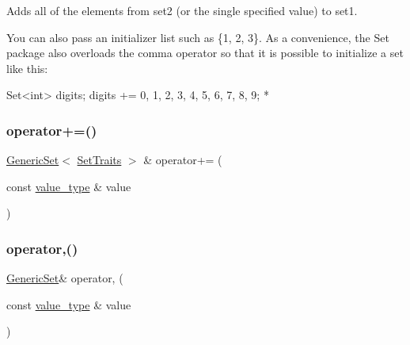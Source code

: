 Adds all of the elements from {\ttfamily set2} (or the single specified value) to {\ttfamily set1}. 

You can also pass an initializer list such as \{1, 2, 3\}. As a convenience, the {\ttfamily Set} package also overloads the comma operator so that it is possible to initialize a set like this\+:


\begin{DoxyPre}
     Set<int> digits;
     digits += 0, 1, 2, 3, 4, 5, 6, 7, 8, 9;
*\end{DoxyPre}
 \mbox{\label{classstanfordcpplib_1_1collections_1_1GenericSet_a47b0925fd317fb30201e28139c7370e5}} 
\subsubsection{\texorpdfstring{operator+=()}{operator+=()}\hspace{0.1cm}{\footnotesize\ttfamily [2/2]}}
{\footnotesize\ttfamily \mbox{\hyperlink{classstanfordcpplib_1_1collections_1_1GenericSet}{Generic\+Set}}$<$ \mbox{\hyperlink{structstanfordcpplib_1_1collections_1_1SetTraits}{Set\+Traits}} $>$ \& operator+= (\begin{DoxyParamCaption}\item[{const \mbox{\hyperlink{classstanfordcpplib_1_1collections_1_1GenericSet_a669c81f158766925e7293f97c0099b28}{value\+\_\+type}} \&}]{value }\end{DoxyParamCaption})}

\mbox{\label{classstanfordcpplib_1_1collections_1_1GenericSet_ad2860c6b9af5560b816dd9f10dc13f27}} 
\subsubsection{\texorpdfstring{operator,()}{operator,()}}
{\footnotesize\ttfamily \mbox{\hyperlink{classstanfordcpplib_1_1collections_1_1GenericSet}{Generic\+Set}}\& operator, (\begin{DoxyParamCaption}\item[{const \mbox{\hyperlink{classstanfordcpplib_1_1collections_1_1GenericSet_a669c81f158766925e7293f97c0099b28}{value\+\_\+type}} \&}]{value }\end{DoxyParamCaption})\hspace{0.3cm}{\ttfamily [inline]}}

